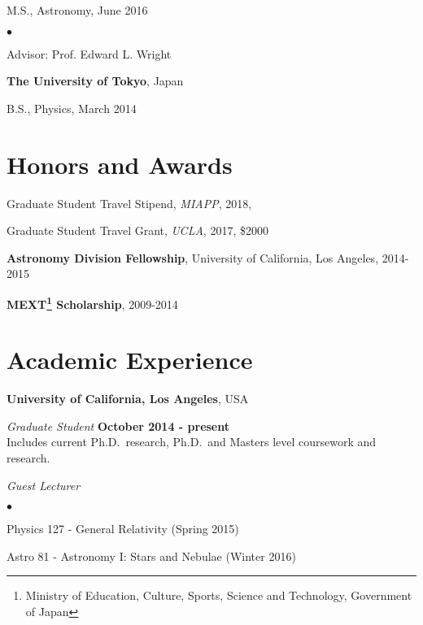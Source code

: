 \documentclass[margin,line]{res}
\newenvironment{list1}{
  \begin{list}{\ding{113}}{%
      \setlength{\itemsep}{0in}
      \setlength{\parsep}{0in} \setlength{\parskip}{0in}
      \setlength{\topsep}{0in} \setlength{\partopsep}{0in} 
      \setlength{\leftmargin}{0.17in}}}{\end{list}}
\newenvironment{list2}{
  \begin{list}{$\bullet$}{%
      \setlength{\itemsep}{0in}
      \setlength{\parsep}{0in} \setlength{\parskip}{0in}
      \setlength{\topsep}{0in} \setlength{\partopsep}{0in} 
      \setlength{\leftmargin}{0.2in}}}{\end{list}}
\begin{document}
\begin{resume}
\begin{list1}
	\item[] M.S., Astronomy,  June 2016
	\begin{list2}
		\vspace*{.05in} 
		\item Advisor:  Prof. Edward L. Wright
	\end{list2}
\end{list1}

{\bf The University of Tokyo}, Japan\\
\vspace*{-.1in}
\begin{list1}
\item[] B.S., Physics,  March 2014
\end{list1}


\section{\sc Honors and Awards} 
Graduate Student Travel Stipend, {\it MIAPP}, 2018, 

\vspace*{-2.5mm}
Graduate Student Travel Grant, {\it UCLA}, 2017, \$2000

\vspace*{-2.5mm}
\textbf{Astronomy Division Fellowship}, University of California, Los Angeles, 2014-2015 

\vspace*{-2.5mm}
\textbf{MEXT\footnote{Ministry of Education, Culture, Sports, Science and Technology, Government of Japan} Scholarship}, 2009-2014


\section{\sc Academic Experience}
{\bf University of California, Los Angeles}, USA

\vspace{-.3cm}
{\em Graduate Student} \hfill {\bf October 2014 - present}\\
Includes current Ph.D.~research, Ph.D.~and Masters level coursework and
research.


{\em Guest Lecturer} \hfill {\bf}\\
\begin{list2}
	\item Physics 127 - General Relativity (Spring 2015)
	\item Astro 81 - Astronomy I: Stars and Nebulae (Winter 2016)
\end{list2}
	

\end{resume}
\end{document}
